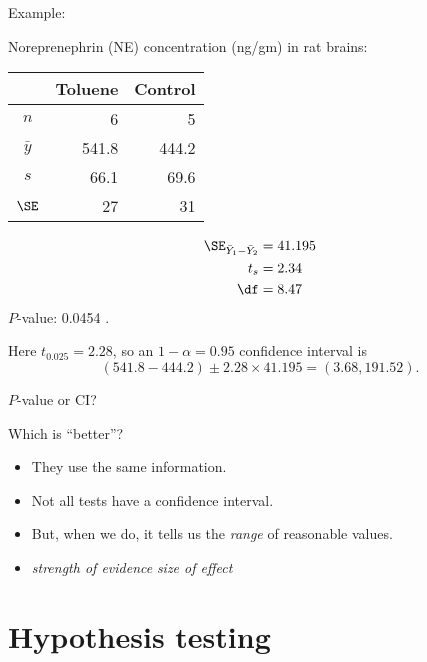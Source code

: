 \begin{frame}{Example: }

    Noreprenephrin (NE) concentration (ng/gm) in rat brains:
    \begin{center}
      \begin{tabular}{c|rr}
            & Toluene & Control \\
          \hline
          $n$ & 6 & 5 \\
          $\bar y$ & 541.8 & 444.2 \\
          $s$  & 66.1 & 69.6 \\
          $\SE$ & 27 & 31 \\
     \end{tabular}
   \end{center}


     \begin{align*}
         \SE_{\bar Y_1 - \bar Y_2} &= 41.195 \\
         t_s &= 2.34  \\
         \df &= 8.47 
     \end{align*}
     $P$-value: 0.0454 .


  \vspace{2em}

  Here $t_{0.025} = 2.28$, so an $1-\alpha=0.95$ confidence interval is
  \[  (541.8-444.2) \pm 2.28 \times 41.195 = (3.68,191.52) . \]

\end{frame}

\begin{frame}{$P$-value or CI?}

  Which is ``better''?

  \pause
  \begin{itemize}
      \item They use the same information.
      \item Not all tests have a confidence interval.
      \item But, when we do, it tells us the \emph{range} of reasonable values.
      \item \emph{strength of evidence}  \emph{size of effect}
  \end{itemize}

\end{frame}



\section{Hypothesis testing}

